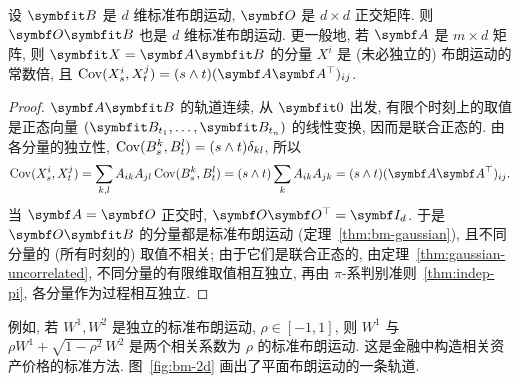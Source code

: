 \begin{proposition}[旋转不变性]\label{prop:bm-rotation}
设 $\rvec{B}$ 是 $d$ 维标准布朗运动, $\mat{O}$ 是 $d\times d$ 正交矩阵. 则 $\mat{O}\rvec{B}$ 也是 $d$ 维标准布朗运动. 更一般地, 若 $\mat{A}$ 是 $m\times d$ 矩阵, 则 $\rvec{X}=\mat{A}\rvec{B}$ 的分量 $X^i$ 是 (未必独立的) 布朗运动的常数倍, 且 $\Cov(X^i_s,X^j_t)=(s\wedge t)(\mat{A}\mat{A}^\T)_{ij}$.
\end{proposition}

\begin{proof}
$\mat{A}\rvec{B}$ 的轨道连续, 从 $\rvec{0}$ 出发, 有限个时刻上的取值是正态向量 $(\rvec{B}_{t_1},\dots,\rvec{B}_{t_n})$ 的线性变换, 因而是联合正态的. 由各分量的独立性, $\operatorname{Cov}(B^k_s,B^l_t)=(s\wedge t)\delta_{kl}$, 所以
\[
\Cov(X^i_s,X^j_t)=\sum_{k,l}A_{ik}A_{jl}\Cov(B^k_s,B^l_t)=(s\wedge t)\sum_kA_{ik}A_{jk}=(s\wedge t)(\mat{A}\mat{A}^\T)_{ij}.
\]
当 $\mat{A}=\mat{O}$ 正交时, $\mat{O}\mat{O}^\T=\mat{I}_d$. 于是 $\mat{O}\rvec{B}$ 的分量都是标准布朗运动 (定理~\ref{thm:bm-gaussian}), 且不同分量的 (所有时刻的) 取值不相关; 由于它们是联合正态的, 由定理~\ref{thm:gaussian-uncorrelated}, 不同分量的有限维取值相互独立, 再由 $\pi$-系判别准则~\ref{thm:indep-pi}, 各分量作为过程相互独立.
\end{proof}

例如, 若 $W^1,W^2$ 是独立的标准布朗运动, $\rho\in[-1,1]$, 则 $W^1$ 与 $\rho W^1+\sqrt{1-\rho^2}\,W^2$ 是两个相关系数为 $\rho$ 的标准布朗运动. 这是金融中构造相关资产价格的标准方法. 图~\ref{fig:bm-2d} 画出了平面布朗运动的一条轨道.

